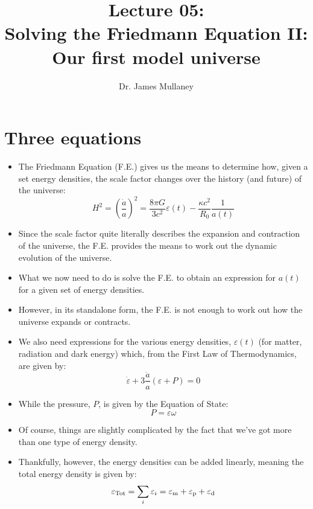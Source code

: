 \documentclass[11pt]{article}
\newcommand{\vep}[1]{\ensuremath{\varepsilon#1}}
\begin{document}
 
\title{Lecture 05:\\Solving the Friedmann Equation {\sc II}:\\
Our first model universe}
\author{Dr. James Mullaney}
\maketitle
\section{Three equations}
\begin{itemize}
\item The Friedmann Equation (F.E.) gives us the means to determine how, given a set energy densities, the scale factor changes over the history (and future) of the universe:
\begin{equation}
H^2 = \left(\frac{\dot{a}}{a}\right)^2 = \frac{8\pi G}{3c^2}\vep{(t)} - \frac{\kappa c^2}{R_0}\frac{1}{a(t)}
\end{equation}
\item Since the scale factor quite literally describes the expansion and contraction of the universe, the F.E. provides the means to work out the dynamic evolution of the universe.
\item What we now need to do is solve the F.E. to obtain an expression for $a(t)$ for a given set of energy densities.
\item However, in its standalone form, the F.E. is not enough to work out how the universe expands or contracts.
\item We also need expressions for the various energy densities, \vep{(t)} (for matter, radiation and dark energy) which, from the First Law of Thermodynamics, are given by:
\begin{equation}
\dot{\vep{}} + 3\frac{\dot{a}}{a}(\vep{} + P) = 0
\end{equation}
\item While the pressure, $P$, is given by the Equation of State:
\begin{equation}
        P = \vep{}\omega
\end{equation}
\item Of course, things are slightly complicated by the fact that we've got more than one type of energy density.
\item Thankfully, however, the energy densities can be added linearly, meaning the total energy density is given by:
\begin{equation}
\vep{_{\rm Tot}} = \sum_i\vep{_{i}} = \vep{_{\rm m}} + \vep{_{\rm p}} + \vep{_{\rm d}}

\end{equation}
\end{itemize}
\end{document}
